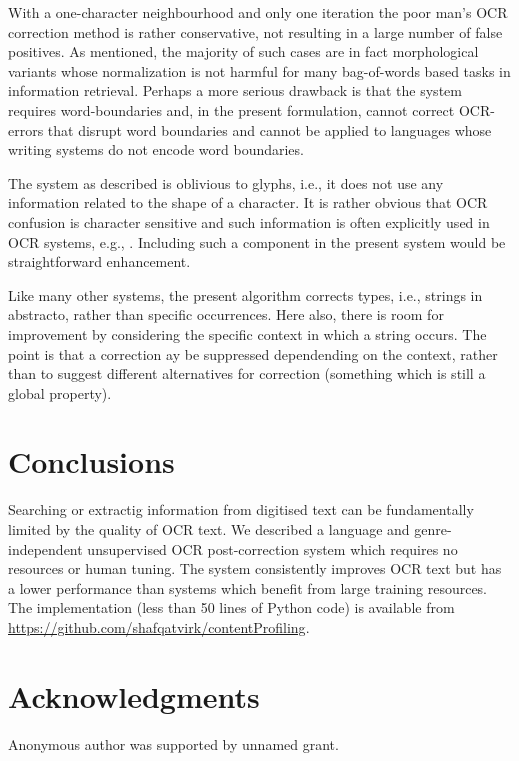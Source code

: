 \documentclass{sig-alternate}
\begin{document}
With a one-character neighbourhood and only one iteration the poor man's
OCR correction method is rather conservative, not resulting in a large
number of false positives. As mentioned, the majority of such cases
are in fact morphological variants whose normalization is not harmful
for many bag-of-words based tasks in information retrieval. Perhaps
a more serious drawback is that the system requires word-boundaries
and, in the present formulation, cannot correct OCR-errors that disrupt
word boundaries and cannot be applied to languages whose writing systems
do not encode word boundaries.

The system as described is oblivious to glyphs, i.e., it does not use
any information related to the shape of a character. It is rather
obvious that OCR confusion is character sensitive and such information
is often explicitly used in OCR systems, e.g., \cite[48-49]{ocr:Evershed}.
Including such a component in the present system would be straightforward
enhancement.

Like many other systems, the present algorithm corrects types, i.e.,
strings in abstracto, rather than specific occurrences. Here also,
there is room for improvement by considering the specific context in
which a string occurs. The point is that a correction ay be suppressed
dependending on the context, rather than to suggest different alternatives
for correction (something which is still a global property).

\section{Conclusions}
Searching or extractig information from digitised text can be
fundamentally limited by the quality of OCR text. We described a
language and genre-independent unsupervised OCR post-correction system
which requires no resources or human tuning. The system consistently
improves OCR text but has a lower performance than systems which
benefit from large training resources. The implementation (less than
50 lines of Python code) is available from
\url{https://github.com/shafqatvirk/contentProfiling}.

\section{Acknowledgments}
Anonymous author was supported by unnamed grant.

%

%
%
\end{document}
